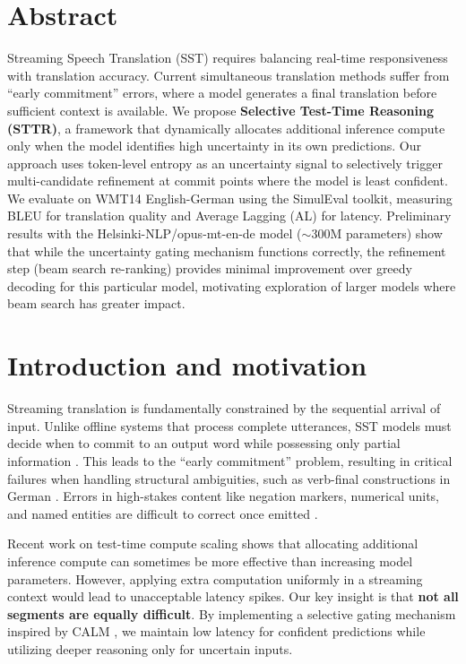 
\section{Abstract}

Streaming Speech Translation (SST) requires balancing real-time responsiveness with translation accuracy. Current simultaneous translation methods suffer from ``early commitment'' errors, where a model generates a final translation before sufficient context is available. We propose \textbf{Selective Test-Time Reasoning (STTR)}, a framework that dynamically allocates additional inference compute only when the model identifies high uncertainty in its own predictions. Our approach uses token-level entropy as an uncertainty signal to selectively trigger multi-candidate refinement at commit points where the model is least confident. We evaluate on WMT14 English-German using the SimulEval toolkit, measuring BLEU for translation quality and Average Lagging (AL) for latency. Preliminary results with the Helsinki-NLP/opus-mt-en-de model ($\sim$300M parameters) show that while the uncertainty gating mechanism functions correctly, the refinement step (beam search re-ranking) provides minimal improvement over greedy decoding for this particular model, motivating exploration of larger models where beam search has greater impact.

\section{Introduction and motivation}

Streaming translation is fundamentally constrained by the sequential arrival of input. Unlike offline systems that process complete utterances, SST models must decide when to commit to an output word while possessing only partial information \citep{ma2019stacl}. This leads to the ``early commitment'' problem, resulting in critical failures when handling structural ambiguities, such as verb-final constructions in German \citep{gu2017learning}. Errors in high-stakes content like negation markers, numerical units, and named entities are difficult to correct once emitted \citep{papi2025real}.

Recent work on test-time compute scaling \citep{snell2024scaling} shows that allocating additional inference compute can sometimes be more effective than increasing model parameters. However, applying extra computation uniformly in a streaming context would lead to unacceptable latency spikes. Our key insight is that \textbf{not all segments are equally difficult}. By implementing a selective gating mechanism inspired by CALM \citep{schuster2022calm}, we maintain low latency for confident predictions while utilizing deeper reasoning only for uncertain inputs.

